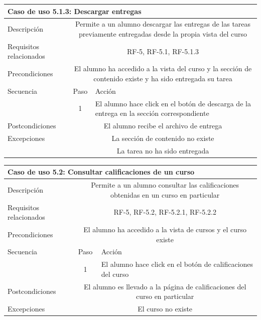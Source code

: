 \hspace{3cm}

\begin{adjustwidth}{-2cm}{}
\begin{tabular}[H]{l c l}
\toprule 
\multicolumn{3}{l}{\textbf{Caso de uso 5.1.3: Descargar entregas}}\\
\midrule
Descripción & \multicolumn{2}{p{10cm}}{Permite a un alumno descargar las entregas de las tareas previamente entregadas desde la propia vista del curso}\\
\midrule
Requisitos relacionados & \multicolumn{2}{p{10cm}}{RF-5, RF-5.1, RF-5.1.3}\\
\midrule
Precondiciones & \multicolumn{2}{p{10cm}}{El alumno ha accedido a la vista del curso y la sección de contenido existe y ha sido entregada su tarea}\\
\midrule
Secuencia & Paso & Acción \\
\cmidrule{2-3}
         & 1 &  \multicolumn{1}{p{8cm}}{El alumno hace click en el botón de descarga de la entrega en la sección correspondiente}\\
         
\midrule
Postcondiciones & \multicolumn{2}{p{10cm}}{El alumno recibe el archivo de entrega}\\
\midrule
Excepciones & \multicolumn{2}{p{10cm}}{La sección de contenido no existe}\\
            & \multicolumn{2}{p{10cm}}{La tarea no ha sido entregada}\\
\bottomrule 
\end{tabular}

\hspace{3cm}


\begin{tabular}[H]{l c l}
\toprule 
\multicolumn{3}{l}{\textbf{Caso de uso 5.2: Consultar calificaciones de un curso}}\\
\midrule
Descripción & \multicolumn{2}{p{10cm}}{Permite a un alumno consultar las calificaciones obtenidas en un curso en particular}\\
\midrule
Requisitos relacionados & \multicolumn{2}{p{10cm}}{RF-5, RF-5.2, RF-5.2.1,  RF-5.2.2}\\
\midrule
Precondiciones & \multicolumn{2}{p{10cm}}{El alumno ha accedido a la vista de cursos y el curso existe}\\
\midrule
Secuencia & Paso & Acción \\
\cmidrule{2-3}
         & 1 &  \multicolumn{1}{p{8cm}}{El alumno hace click en el botón de calificaciones del curso}\\

\midrule
Postcondiciones & \multicolumn{2}{p{10cm}}{El alumno es llevado a la página de calificaciones del curso en particular}\\
\midrule
Excepciones & \multicolumn{2}{p{10cm}}{El curso no existe}\\
\bottomrule 
\end{tabular}
\end{adjustwidth}

